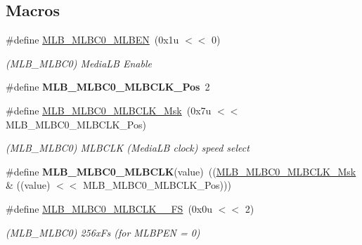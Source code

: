 \subsection*{Macros}
\begin{DoxyCompactItemize}
\item 
\mbox{\label{group__SAMV71__MLB_ga76053ebd3f566639d7ac4a3c32d7dd0b}} 
\#define \mbox{\hyperlink{group__SAMV71__MLB_ga76053ebd3f566639d7ac4a3c32d7dd0b}{M\+L\+B\+\_\+\+M\+L\+B\+C0\+\_\+\+M\+L\+B\+EN}}~(0x1u $<$$<$ 0)
\begin{DoxyCompactList}\small\item\em (M\+L\+B\+\_\+\+M\+L\+B\+C0) Media\+LB Enable \end{DoxyCompactList}\item 
\mbox{\label{group__SAMV71__MLB_ga69bcb2510d9e8d5dcd746739ad38e2aa}} 
\#define {\bfseries M\+L\+B\+\_\+\+M\+L\+B\+C0\+\_\+\+M\+L\+B\+C\+L\+K\+\_\+\+Pos}~2
\item 
\mbox{\label{group__SAMV71__MLB_gac04c2c729cd6ab19e0aad71c260b5f72}} 
\#define \mbox{\hyperlink{group__SAMV71__MLB_gac04c2c729cd6ab19e0aad71c260b5f72}{M\+L\+B\+\_\+\+M\+L\+B\+C0\+\_\+\+M\+L\+B\+C\+L\+K\+\_\+\+Msk}}~(0x7u $<$$<$ M\+L\+B\+\_\+\+M\+L\+B\+C0\+\_\+\+M\+L\+B\+C\+L\+K\+\_\+\+Pos)
\begin{DoxyCompactList}\small\item\em (M\+L\+B\+\_\+\+M\+L\+B\+C0) M\+L\+B\+C\+LK (Media\+LB clock) speed select \end{DoxyCompactList}\item 
\mbox{\label{group__SAMV71__MLB_gabd9bbfcfa2dda31324f3fd3a1e87e887}} 
\#define {\bfseries M\+L\+B\+\_\+\+M\+L\+B\+C0\+\_\+\+M\+L\+B\+C\+LK}(value)~((\mbox{\hyperlink{group__SAMV71__MLB_gac04c2c729cd6ab19e0aad71c260b5f72}{M\+L\+B\+\_\+\+M\+L\+B\+C0\+\_\+\+M\+L\+B\+C\+L\+K\+\_\+\+Msk}} \& ((value) $<$$<$ M\+L\+B\+\_\+\+M\+L\+B\+C0\+\_\+\+M\+L\+B\+C\+L\+K\+\_\+\+Pos)))
\item 
\mbox{\label{group__SAMV71__MLB_gacae053d328d8525c5ff5323724441e49}} 
\#define \mbox{\hyperlink{group__SAMV71__MLB_gacae053d328d8525c5ff5323724441e49}{M\+L\+B\+\_\+\+M\+L\+B\+C0\+\_\+\+M\+L\+B\+C\+L\+K\+\_\+\_\+\+FS}}~(0x0u $<$$<$ 2)
\begin{DoxyCompactList}\small\item\em (M\+L\+B\+\_\+\+M\+L\+B\+C0) 256x\+Fs (for M\+L\+B\+P\+EN = 0) \end{DoxyCompactList}\item 

\end{DoxyCompactItemize}
